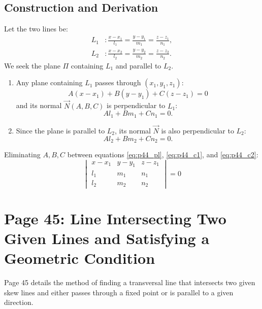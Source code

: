 \subsection{Construction and Derivation}
Let the two lines be:
\begin{align}
    L_1 &: \frac{x - x_1}{l_1} = \frac{y - y_1}{m_1} = \frac{z - z_1}{n_1}, \\
    L_2 &: \frac{x - x_2}{l_2} = \frac{y - y_2}{m_2} = \frac{z - z_2}{n_2}.
\end{align}
We seek the plane $\Pi$ containing $L_1$ and parallel to $L_2$.
\begin{enumerate}
    \item Any plane containing $L_1$ passes through $(x_1, y_1, z_1)$:
    \begin{equation}
        A(x - x_1) + B(y - y_1) + C(z - z_1) = 0 \label{eq:p44_pl}
    \end{equation}
    and its normal $\vec{N}(A, B, C)$ is perpendicular to $L_1$:
    \begin{equation}
        Al_1 + Bm_1 + Cn_1 = 0. \label{eq:p44_c1}
    \end{equation}
    \item Since the plane is parallel to $L_2$, its normal $\vec{N}$ is also perpendicular to $L_2$:
    \begin{equation}
        Al_2 + Bm_2 + Cn_2 = 0. \label{eq:p44_c2}
    \end{equation}
\end{enumerate}
Eliminating $A, B, C$ between equations \eqref{eq:p44_pl}, \eqref{eq:p44_c1}, and \eqref{eq:p44_c2}:
\begin{equation}
    \boxed{\begin{vmatrix}
    x - x_1 & y - y_1 & z - z_1 \\
    l_1 & m_1 & n_1 \\
    l_2 & m_2 & n_2
    \end{vmatrix} = 0}
\end{equation}

\section{Page 45: Line Intersecting Two Given Lines and Satisfying a Geometric Condition}
\label{sec:page45}

\begin{conceptbox}
Page 45 details the method of finding a transversal line that intersects two given skew lines and either passes through a fixed point or is parallel to a given direction.
\end{conceptbox}

